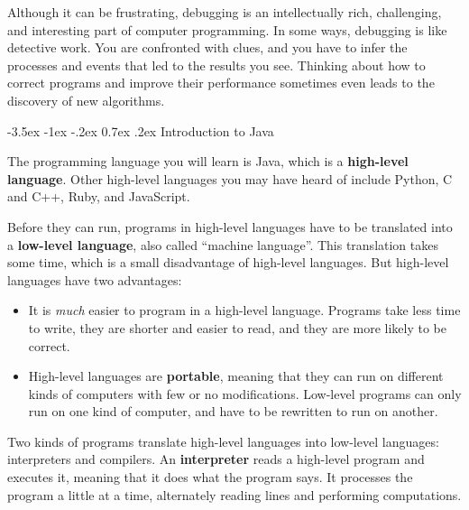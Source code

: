 \documentclass[12pt]{book}
\makeatletter
\theoremstyle{exercise}
\renewcommand{\section}{\@startsection{section}{1}{\z@}%
    {-3.5ex \@plus -1ex \@minus -.2ex}%
    {0.7ex \@plus.2ex}%
    {\normalfont\Large\bfseries}}
\makeatother
\begin{document}
Although it can be frustrating, debugging is an intellectually rich, challenging, and interesting part of computer programming.
In some ways, debugging is like detective work.
You are confronted with clues, and you have to infer the processes and events that led to the results you see.
Thinking about how to correct programs and improve their performance sometimes even leads to the discovery of new algorithms.


\section{Introduction to Java}


The programming language you will learn is Java, which is a {\bf high-level language}.
Other high-level languages you may have heard of include Python, C and C++, Ruby, and JavaScript.


Before they can run, programs in high-level languages have to be translated into a {\bf low-level language}, also called ``machine language''.
This translation takes some time, which is a small disadvantage of high-level languages.
But high-level languages have two advantages:

\begin{itemize}

\item It is {\em much} easier to program in a high-level language.
Programs take less time to write, they are shorter and easier to read, and they are more likely to be correct.


\item High-level languages are {\bf portable}, meaning that they can run on different kinds of computers with few or no modifications.
Low-level programs can only run on one kind of computer, and have to be rewritten to run on another.

\end{itemize}


Two kinds of programs translate high-level languages into low-level languages: interpreters and compilers.
An {\bf interpreter} reads a high-level program and executes it, meaning that it does what the program says.
It processes the program a little at a time, alternately reading lines and performing computations.
\end{document}

